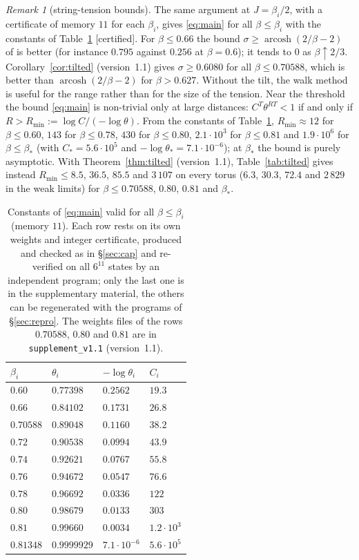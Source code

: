 \documentclass[11pt,a4paper]{article}
\theoremstyle{plain}
\theoremstyle{remark}
\newtheorem{remark}[theorem]{Remark}
\numberwithin{equation}{section}
\newcommand{\st}[1]{\textsf{[#1]}}
\begin{document}
\begin{remark}[string-tension bounds]\label{rem:table}
The same argument at $J=\beta_i/2$, with a certificate of memory $11$ for each $\beta_i$, gives \eqref{eq:main} for all
$\beta\le\beta_i$ with the constants of Table~\ref{tab:tension} \st{certified}. For $\beta\le0.66$ the bound
$\sigma\ge\operatorname{arcosh}(2/\beta-2)$ of \cite[Cor.~7.2]{D7} is better (for instance $0.795$ against $0.256$ at $\beta=0.6$); it
tends to $0$ as $\beta\uparrow2/3$. Corollary~\ref{cor:tilted} (version~1.1) gives $\sigma\ge0.6080$ for all $\beta\le0.70588$, which is better than
$\operatorname{arcosh}(2/\beta-2)$ for $\beta>0.627$. Without the tilt, the walk method is useful for the range rather than for the size of
the tension.
Near the threshold the bound \eqref{eq:main} is non-trivial only at large distances: $C^T\theta^{RT}<1$ if and only if
$R>R_{\min}:=\log C/(-\log\theta)$. From the constants of Table~\ref{tab:tension}, $R_{\min}\approx12$ for $\beta\le0.60$,
$143$ for $\beta\le0.78$, $430$ for $\beta\le0.80$, $2.1\cdot10^{3}$ for $\beta\le0.81$ and $1.9\cdot10^{6}$ for $\beta\le\beta_*$
(with $C_*=5.6\cdot10^5$ and $-\log\theta_*=7.1\cdot10^{-6}$); at $\beta_*$ the bound is purely asymptotic. With Theorem~\ref{thm:tilted} (version~1.1), Table~\ref{tab:tilted} gives instead
$R_{\min}\le8.5$, $36.5$, $85.5$ and $3\,107$ on every torus ($6.3$, $30.3$, $72.4$ and $2\,829$ in the weak limits) for $\beta\le0.70588$,
$0.80$, $0.81$ and $\beta_*$.
\end{remark}

\begin{table}[ht]
\centering\small
\begin{tabular}{@{}llll@{}}
\toprule
$\beta_i$ & $\theta_i$ & $-\log\theta_i$ & $C_i$\\
\midrule
$0.60$ & $0.77398$ & $0.2562$ & $19.3$\\
$0.66$ & $0.84102$ & $0.1731$ & $26.8$\\
$0.70588$ & $0.89048$ & $0.1160$ & $38.2$\\
$0.72$ & $0.90538$ & $0.0994$ & $43.9$\\
$0.74$ & $0.92621$ & $0.0767$ & $55.8$\\
$0.76$ & $0.94672$ & $0.0547$ & $76.6$\\
$0.78$ & $0.96692$ & $0.0336$ & $122$\\
$0.80$ & $0.98679$ & $0.0133$ & $303$\\
$0.81$ & $0.99660$ & $0.0034$ & $1.2\cdot10^{3}$\\
$0.81348$ & $0.9999929$ & $7.1\cdot10^{-6}$ & $5.6\cdot10^{5}$\\
\bottomrule
\end{tabular}
\caption{Constants of \eqref{eq:main} valid for all $\beta\le\beta_i$ (memory $11$). Each row rests on its own weights and integer
certificate, produced and checked as in \S\ref{sec:cap} and re-verified on all $6^{11}$ states by an independent program; only the
last one is in the supplementary material, the others can be regenerated with the programs of \S\ref{sec:repro}. The weights files
of the rows $0.70588$, $0.80$ and $0.81$ are in \texttt{supplement\_v1.1} (version~1.1).}
\label{tab:tension}
\end{table}
\end{document}
